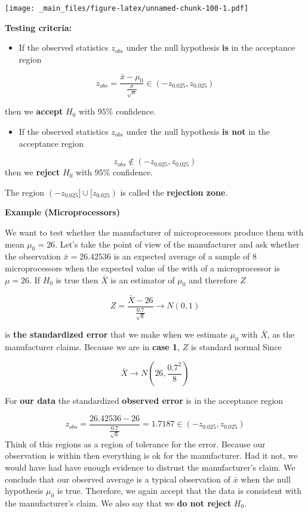 \documentclass[
]{book}
\providecommand{\tightlist}{%
  \setlength{\itemsep}{0pt}\setlength{\parskip}{0pt}}
\begin{document}
\texttt{[image: \_main\_files/figure-latex/unnamed-chunk-100-1.pdf]}

\textbf{Testing criteria:}

\begin{itemize}
\tightlist
\item
  If the observed statistics \(z_{obs}\) under the null hypothesis \textbf{is} in the acceptance region
\end{itemize}

\[z_{obs}=\frac{\bar{x}-\mu_0}{\frac{\sigma}{\sqrt{n}}} \in (-z_{0.025}, z_{0.025})\]

then we \textbf{accept} \(H_0\) with \(95\%\) confidence.

\begin{itemize}
\tightlist
\item
  If the observed statistics \(z_{obs}\) under the null hypothesis \textbf{is not} in the acceptance region
\end{itemize}

\[z_{obs} \notin (-z_{0.025}, z_{0.025})\] then we \textbf{reject} \(H_0\) with \(95\%\) confidence.

The region \((-z_{0.025}] \cup[z_{0.025})\) is called the \textbf{rejection zone}.

\textbf{Example (Microprocessors)}

We want to test whether the manufacturer of microprocessors produce them with mean \(\mu_0=26\). Let's take the point of view of the manufacturer and ask whether the observation \(\bar{x}=26.42536\) is an expected average of a sample of \(8\) microprocessors when the expected value of the with of a microprocessor is \(\mu=26\). If \(H_0\) is true then \(\bar{X}\) is an estimator of \(\mu_0\) and therefore \(Z\)

\[Z=\frac{\bar{X}-26}{\frac{0.7}{\sqrt{8}}}  \rightarrow N(0,1)\]

is \textbf{the standardized error} that we make when we estimate \(\mu_0\) with \(\bar{X}\), as the manufacturer claims. Because we are in \textbf{case 1}, \(Z\) is standard normal
Since

\[\bar{X} \rightarrow N(26, \frac{0.7^2}{8})\]

For \textbf{our data} the standardized \textbf{observed error} is in the acceptance region

\[z_{obs}=\frac{26.42536-26}{\frac{0.7}{\sqrt{8}}}=1.7187 \in (-z_{0.025}, z_{0.025})\]
Think of this regions as a region of tolerance for the error. Because our observation is within then everything is ok for the manufacturer. Had it not, we would have had have enough evidence to distrust the manufacturer's claim. We conclude that our observed average is a typical observation of \(\bar{x}\) when the null hypothesis \(\mu_0\) is true. Therefore, we again accept that the data is consistent with the manufacturer's claim. We also say that we \textbf{do not reject} \(H_0\).
\end{document}
